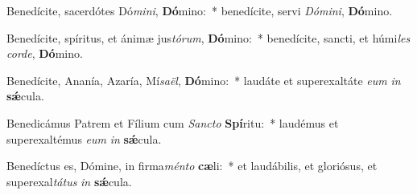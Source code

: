 \item Benedícite, sacerdótes Dó\textit{mi}\textit{ni}, \textbf{Dó}mino:~* benedícite, servi \textit{Dó}\textit{mi}\textit{ni}, \textbf{Dó}mino.
\item Benedícite, spíritus, et ánimæ jus\textit{tó}\textit{rum}, \textbf{Dó}mino:~* benedícite, sancti, et húmi\textit{les} \textit{cor}\textit{de}, \textbf{Dó}mino.
\item Benedícite, Ananía, Azaría, Mí\textit{sa}\textit{ël}, \textbf{Dó}mino:~* laudáte et superexaltáte \textit{e}\textit{um} \textit{in} \textbf{sǽ}cula.
\item Benedicámus Patrem et Fílium cum \textit{Sanc}\textit{to} \textbf{Spí}ritu:~* laudémus et superexaltémus \textit{e}\textit{um} \textit{in} \textbf{sǽ}cula.
\item Benedíctus es, Dómine, in firma\textit{mén}\textit{to} \textbf{cæ}li:~* et laudábilis, et gloriósus, et superexal\textit{tá}\textit{tus} \textit{in} \textbf{sǽ}cula.
